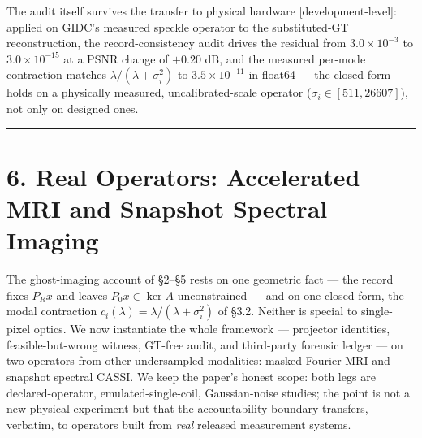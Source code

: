 \documentclass[11pt]{article}
\begin{document}
The audit itself survives the transfer to physical hardware [development-level]: applied on GIDC's measured speckle operator to the substituted-GT reconstruction, the record-consistency audit drives the residual from $3.0\times10^{-3}$ to $3.0\times10^{-15}$ at a PSNR change of $+0.20$ dB, and the measured per-mode contraction matches $\lambda/(\lambda+\sigma_i^2)$ to $3.5\times10^{-11}$ in float64 --- the closed form holds on a physically measured, uncalibrated-scale operator ($\sigma_i \in [511, 26607]$), not only on designed ones.

\medskip\noindent{}\medskip

\medskip\hrule\medskip

\section*{6. Real Operators: Accelerated MRI and Snapshot Spectral Imaging}

The ghost-imaging account of §2--§5 rests on one geometric fact --- the record fixes $P_R x$ and leaves $P_0 x \in \ker A$ unconstrained --- and on one closed form, the modal contraction $c_i(\lambda)=\lambda/(\lambda+\sigma_i^2)$ of §3.2. Neither is special to single-pixel optics. We now instantiate the whole framework --- projector identities, feasible-but-wrong witness, GT-free audit, and third-party forensic ledger --- on two operators from other undersampled modalities: masked-Fourier MRI and snapshot spectral CASSI. We keep the paper's honest scope: both legs are declared-operator, emulated-single-coil, Gaussian-noise studies; the point is not a new physical experiment but that the accountability boundary transfers, verbatim, to operators built from \textit{real} released measurement systems.
\end{document}
